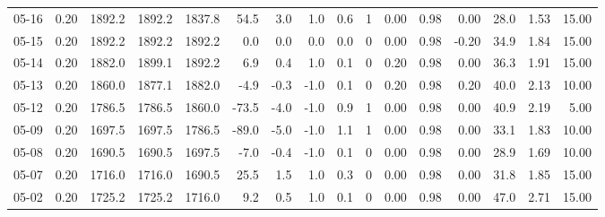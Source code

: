 \begin{threeparttable}
{\begin{tabular}{lrrrrrrrrrrrrrrr}
  05-16 &     0.20 & 1892.2 & 1892.2 & 1837.8 &       54.5 &            3.0 &                      1.0 &                 0.6 &              1 &       0.00 &      0.98 &           0.00 &             28.0 &            1.53 &                  15.00 \\
  05-15 &     0.20 & 1892.2 & 1892.2 & 1892.2 &        0.0 &            0.0 &                      0.0 &                 0.0 &              0 &       0.00 &      0.98 &          -0.20 &             34.9 &            1.84 &                  15.00 \\
  05-14 &     0.20 & 1882.0 & 1899.1 & 1892.2 &        6.9 &            0.4 &                      1.0 &                 0.1 &              0 &       0.20 &      0.98 &           0.00 &             36.3 &            1.91 &                  15.00 \\
  05-13 &     0.20 & 1860.0 & 1877.1 & 1882.0 &       -4.9 &           -0.3 &                     -1.0 &                 0.1 &              0 &       0.20 &      0.98 &           0.20 &             40.0 &            2.13 &                  10.00 \\
  05-12 &     0.20 & 1786.5 & 1786.5 & 1860.0 &      -73.5 &           -4.0 &                     -1.0 &                 0.9 &              1 &       0.00 &      0.98 &           0.00 &             40.9 &            2.19 &                   5.00 \\
  05-09 &     0.20 & 1697.5 & 1697.5 & 1786.5 &      -89.0 &           -5.0 &                     -1.0 &                 1.1 &              1 &       0.00 &      0.98 &           0.00 &             33.1 &            1.83 &                  10.00 \\
  05-08 &     0.20 & 1690.5 & 1690.5 & 1697.5 &       -7.0 &           -0.4 &                     -1.0 &                 0.1 &              0 &       0.00 &      0.98 &           0.00 &             28.9 &            1.69 &                  10.00 \\
  05-07 &     0.20 & 1716.0 & 1716.0 & 1690.5 &       25.5 &            1.5 &                      1.0 &                 0.3 &              0 &       0.00 &      0.98 &           0.00 &             31.8 &            1.85 &                  15.00 \\
  05-02 &     0.20 & 1725.2 & 1725.2 & 1716.0 &        9.2 &            0.5 &                      1.0 &                 0.1 &              0 &       0.00 &      0.98 &           0.00 &             47.0 &            2.71 &                  15.00 \\

\end{tabular}}
\end{threeparttable}
